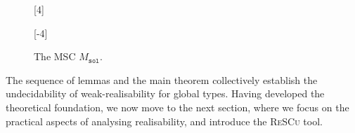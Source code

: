 \begin{example}
\begin{figure}[!ht]
\centering
\begin{msc}[draw frame=none, draw head=none, msc keyword=, head height=0px, label distance=0.5ex, foot height=0px, foot distance=0px]{}

	\nextlevel

	\nextlevel
	[-4]
	\nextlevel
	
\end{msc}
\caption{The MSC $M_\texttt{sol}$.}
\label{fig:exmp-msol}
\end{figure}

\end{example}

The sequence of lemmas and the main theorem collectively establish the
undecidability of weak-realisability for global types. Having developed the
theoretical foundation, we now move to the next section, where we focus on the
practical aspects of analysing realisability, and introduce the \textsc{ReSCu} tool.